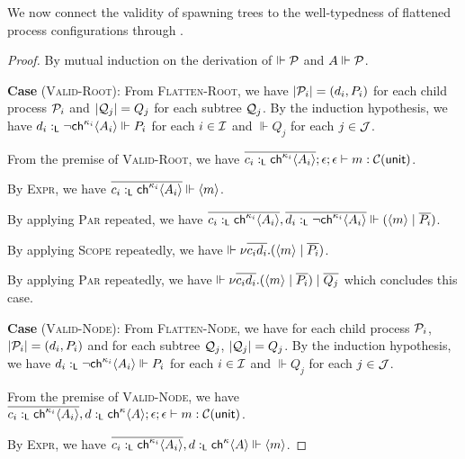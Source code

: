 We now connect the validity of spawning trees to the well-typedness of flattened process configurations
through .
\begin{proof}
  By mutual induction on the derivation of $\Vdash \mathcal{P}$ and $A \Vdash \mathcal{P}$.

\noindent
\textbf{Case} (\textsc{Valid-Root}):
  From \textsc{Flatten-Root}, we have
  $| \mathcal{P}_i | = (d_i, P_i)$ for each child process $\mathcal{P}_i$ and
  $| \mathcal{Q}_j | = Q_j$ for each subtree $\mathcal{Q}_j$.
  By the induction hypothesis, we have $d_i :_{\textsf{L}} \neg{\textsf{ch}^{\kappa_i}\langle{A_i}\rangle} \Vdash P_i$ for each $i \in \mathcal{I}$
  and $\Vdash Q_j$ for each $j \in \mathcal{J}$.

  \noindent
  From the premise of \textsc{Valid-Root}, we have
  $\overline{c_i :_{\textsf{L}} \textsf{ch}^{\kappa_i}\langle{A_i}\rangle} ; \epsilon ; \epsilon \vdash m :\mathcal{C}({\textsf{unit}})$.

  \noindent
  By \textsc{Expr}, we have
  $\overline{c_i :_{\textsf{L}} \textsf{ch}^{\kappa_i}\langle{A_i}\rangle} \Vdash {\langle{m}\rangle}$.

  \noindent
  By applying \textsc{Par} repeated, we have
  $\overline{c_i :_{\textsf{L}} \textsf{ch}^{\kappa_i}\langle{A_i}\rangle}, \overline{d_i :_{\textsf{L}} \neg{\textsf{ch}^{\kappa_i}\langle{A_i}\rangle}} \Vdash ({\langle{m}\rangle} \mid \overline{P_i})$.

  \noindent
  By applying \textsc{Scope} repeatedly, we have
  $\Vdash {\nu{\overline{c_i d_i}}.{({\langle{m}\rangle} \mid \overline{P_i})}}$.

  \noindent
  By applying \textsc{Par} repeatedly, we have
  $\Vdash {\nu{\overline{c_i d_i}}.{({\langle{m}\rangle} \mid \overline{P_i})}} \mid \overline{Q_j}$
  which concludes this case.

\textbf{Case} (\textsc{Valid-Node}):
  From \textsc{Flatten-Node}, we have for each child process $\mathcal{P}_i$, $| \mathcal{P}_i | = (d_i, P_i)$ and
  for each subtree $\mathcal{Q}_j$, $| \mathcal{Q}_j | = Q_j$.
  By the induction hypothesis, we have $d_i :_{\textsf{L}} \neg{\textsf{ch}^{\kappa_i}\langle{A_i}\rangle} \Vdash P_i$ for each $i \in \mathcal{I}$
  and $\Vdash Q_j$ for each $j \in \mathcal{J}$.

  \noindent
  From the premise of \textsc{Valid-Node}, we have
  $\overline{c_i :_{\textsf{L}} \textsf{ch}^{\kappa_i}\langle{A_i}\rangle}, d :_{\textsf{L}} \textsf{ch}^{\kappa}\langle{A}\rangle ; \epsilon ; \epsilon \vdash m :\mathcal{C}({\textsf{unit}})$.

  \noindent
  By \textsc{Expr}, we have
  $\overline{c_i :_{\textsf{L}} \textsf{ch}^{\kappa_i}\langle{A_i}\rangle}, d :_{\textsf{L}} \textsf{ch}^{\kappa}\langle{A}\rangle \Vdash {\langle{m}\rangle}$.


\end{proof}
